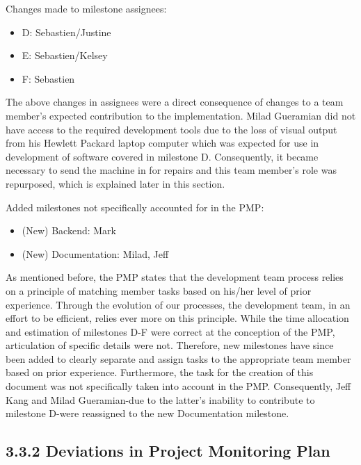 \documentclass[]{article}
\begin{document}
Changes made to milestone assignees:

\begin{itemize}
\itemsep1pt\parskip0pt
\item
  D: Sebastien/Justine
\item
  E: Sebastien/Kelsey
\item
  F: Sebastien
\end{itemize}

The above changes in assignees were a direct consequence of changes to a
team member's expected contribution to the implementation. Milad
Gueramian did not have access to the required development tools due to
the loss of visual output from his Hewlett Packard laptop computer which
was expected for use in development of software covered in milestone D.
Consequently, it became necessary to send the machine in for repairs and
this team member's role was repurposed, which is explained later in this
section.

Added milestones not specifically accounted for in the PMP:

\begin{itemize}
\itemsep1pt\parskip0pt
\item
  (New) Backend: Mark
\item
  (New) Documentation: Milad, Jeff
\end{itemize}

As mentioned before, the PMP states that the development team process
relies on a principle of matching member tasks based on his/her level of
prior experience. Through the evolution of our processes, the
development team, in an effort to be efficient, relies ever more on this
principle. While the time allocation and estimation of milestones D-F
were correct at the conception of the PMP, articulation of specific
details were not. Therefore, new milestones have since been added to
clearly separate and assign tasks to the appropriate team member based
on prior experience. Furthermore, the task for the creation of this
document was not specifically taken into account in the PMP.
Consequently, Jeff Kang and Milad Gueramian-due to the latter's
inability to contribute to milestone D-were reassigned to the new
Documentation milestone.

\subsection{3.3.2 Deviations in Project Monitoring
Plan}\label{deviations-in-project-monitoring-plan}
\end{document}

